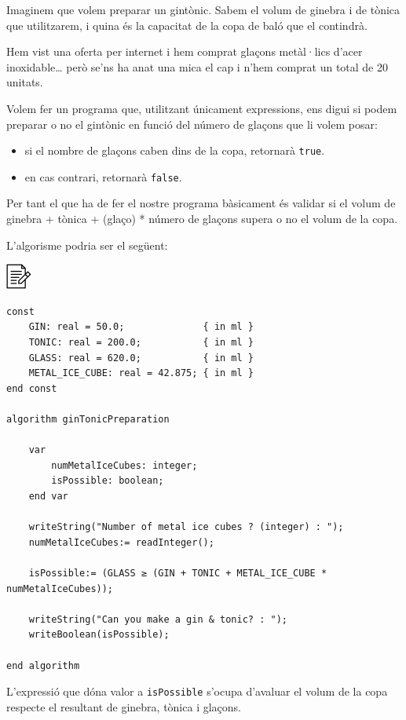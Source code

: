\documentclass[]{book}
\providecommand{\tightlist}{%
  \setlength{\itemsep}{0pt}\setlength{\parskip}{0pt}}
\begin{document}
Imaginem que volem preparar un gintònic. Sabem el volum de ginebra i de tònica que utilitzarem, i quina és la capacitat de la copa de baló que el contindrà.

Hem vist una oferta per internet i hem comprat glaçons metàl·lics d'acer inoxidable\ldots{} però se'ns ha anat una mica el cap i n'hem comprat un total de 20 unitats.

Volem fer un programa que, utilitzant únicament expressions, ens digui si podem preparar o no el gintònic en funció del número de glaçons que li volem posar:

\begin{itemize}
\tightlist
\item
  si el nombre de glaçons caben dins de la copa, retornarà \texttt{true}.
\item
  en cas contrari, retornarà \texttt{false}.
\end{itemize}

Per tant el que ha de fer el nostre programa bàsicament és validar si el volum de ginebra + tònica + (glaço) * número de glaçons supera o no el volum de la copa.

L'algorisme podria ser el següent:

\includegraphics{./img/alg.png}

\begin{verbatim}
const
    GIN: real = 50.0;              { in ml }
    TONIC: real = 200.0;           { in ml }
    GLASS: real = 620.0;           { in ml }
    METAL_ICE_CUBE: real = 42.875; { in ml }
end const

algorithm ginTonicPreparation

    var
        numMetalIceCubes: integer;
        isPossible: boolean;
    end var

    writeString("Number of metal ice cubes ? (integer) : ");
    numMetalIceCubes:= readInteger();

    isPossible:= (GLASS ≥ (GIN + TONIC + METAL_ICE_CUBE * numMetalIceCubes));

    writeString("Can you make a gin & tonic? : ");
    writeBoolean(isPossible);

end algorithm
\end{verbatim}

L'expressió que dóna valor a \texttt{isPossible} s'ocupa d'avaluar el volum de la copa respecte el resultant de ginebra, tònica i glaçons.
\end{document}
